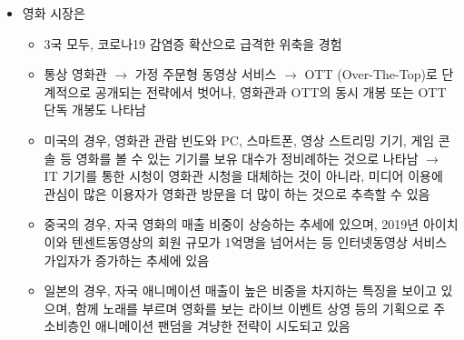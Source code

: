 \begin{itemize}
\begin{itemize}
		
	\item 영화 시장은
		\begin{itemize}
		\item 3국 모두, 코로나19 감염증 확산으로 급격한 위축을 경험
		\item 통상 영화관 $\rightarrow$ 가정 주문형 동영상 서비스 $\rightarrow$ OTT (Over-The-Top)로 단계적으로 공개되는 전략에서 벗어나, 영화관과 OTT의 동시 개봉 또는 OTT 단독 개봉도 나타남
		\item 미국의 경우, 영화관 관람 빈도와 PC, 스마트폰, 영상 스트리밍 기기, 게임 콘솔 등 영화를 볼 수 있는 기기를 보유 대수가 정비례하는 것으로 나타남 $\rightarrow$ IT 기기를 통한 시청이 영화관 시청을 대체하는 것이 아니라, 미디어 이용에 관심이 많은 이용자가 영화관 방문을 더 많이 하는 것으로 추측할 수 있음 
		\item 중국의 경우, 자국 영화의 매출 비중이 상승하는 추세에 있으며, 2019년 아이치이와 텐센트동영상의 회원 규모가 1억명을 넘어서는 등 인터넷동영상 서비스 가입자가 증가하는 추세에 있음
		\item 일본의 경우, 자국 애니메이션 매출이 높은 비중을 차지하는 특징을 보이고 있으며, 함께 노래를 부르며 영화를 보는 라이브 이벤트 상영 등의 기획으로 주 소비층인 애니메이션 팬덤을 겨냥한 전략이 시도되고 있음
		\end{itemize}	
		

\end{itemize}
\end{itemize}

